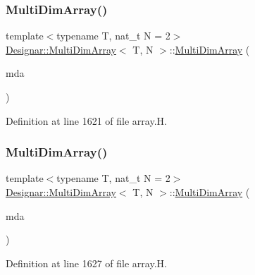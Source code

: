 \subsubsection{\texorpdfstring{Multi\+Dim\+Array()}{MultiDimArray()}\hspace{0.1cm}{\footnotesize\ttfamily [3/4]}}
{\footnotesize\ttfamily template$<$typename T, nat\+\_\+t N = 2$>$ \\
\hyperlink{class_designar_1_1_multi_dim_array}{Designar\+::\+Multi\+Dim\+Array}$<$ T, N $>$\+::\hyperlink{class_designar_1_1_multi_dim_array}{Multi\+Dim\+Array} (\begin{DoxyParamCaption}\item[{const \hyperlink{class_designar_1_1_multi_dim_array}{Multi\+Dim\+Array}$<$ T, N $>$ \&}]{mda }\end{DoxyParamCaption})\hspace{0.3cm}{\ttfamily [inline]}}



Definition at line 1621 of file array.\+H.

\mbox{\label{class_designar_1_1_multi_dim_array_aaa91d894b0e4065cba28a9066c0513b8}} 
\subsubsection{\texorpdfstring{Multi\+Dim\+Array()}{MultiDimArray()}\hspace{0.1cm}{\footnotesize\ttfamily [4/4]}}
{\footnotesize\ttfamily template$<$typename T, nat\+\_\+t N = 2$>$ \\
\hyperlink{class_designar_1_1_multi_dim_array}{Designar\+::\+Multi\+Dim\+Array}$<$ T, N $>$\+::\hyperlink{class_designar_1_1_multi_dim_array}{Multi\+Dim\+Array} (\begin{DoxyParamCaption}\item[{\hyperlink{class_designar_1_1_multi_dim_array}{Multi\+Dim\+Array}$<$ T, N $>$ \&\&}]{mda }\end{DoxyParamCaption})\hspace{0.3cm}{\ttfamily [inline]}}



Definition at line 1627 of file array.\+H.



